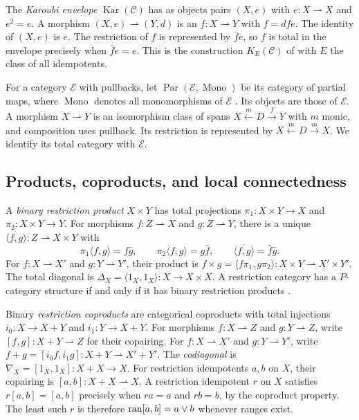 The \emph{Karoubi envelope} $\operatorname{Kar}(\mathcal C)$ has as objects
pairs $(X,e)$ with $e:X\rightharpoonup X$ and $e^2=e$. A morphism
$(X,e)\rightharpoonup(Y,d)$ is an $f:X\rightharpoonup Y$ with $f=dfe$. The identity of
$(X,e)$ is $e$. The restriction of $f$ is represented by $\bar f e$,
so $f$ is total in the envelope precisely when $\bar f e=e$.
This is the construction $K_E(\mathcal C)$ of
\cite[Section~2.3.3, Proposition~2.26]{CockettLack} with $E$ the class
of all idempotents.

For a category $\mathcal E$ with pullbacks, let
$\operatorname{Par}(\mathcal E,\operatorname{Mono})$ be its category
of partial maps, where $\operatorname{Mono}$ denotes all monomorphisms
of $\mathcal E$ \cite[Section~3]{CockettLack}.
Its objects are those of $\mathcal E$. A morphism
$X\rightharpoonup Y$ is an isomorphism class of spans
$X\xleftarrow{m}D\xrightarrow{f}Y$ with $m$ monic, and composition
uses pullback. Its restriction is represented by
$X\xleftarrow{m}D\xrightarrow{m}X$.
We identify its total category with $\mathcal E$.

\subsection{Products, coproducts, and local connectedness}

A \emph{binary restriction product} $X\times Y$ has total
projections $\pi_1:X\times Y\to X$ and $\pi_2:X\times Y\to Y$.
For morphisms $f:Z\rightharpoonup X$ and $g:Z\rightharpoonup Y$,
there is a unique $\langle f,g\rangle:Z\rightharpoonup X\times Y$
with
\[
 \pi_1\langle f,g\rangle=f\bar g,\qquad
 \pi_2\langle f,g\rangle=g\bar f,\qquad
 \overline{\langle f,g\rangle}=\bar f\bar g.
\]
For $f:X\rightharpoonup X'$ and $g:Y\rightharpoonup Y'$, their product is
$f\times g=\langle f\pi_1,g\pi_2\rangle:X\times Y\rightharpoonup X'\times Y'$.
The total diagonal is
$\Delta_X=\langle1_X,1_X\rangle:X\to X\times X$.
A restriction category has a $P$-category structure if and only if
it has binary restriction products
\cite[Proposition 4.5]{CockettLackIII}.

Binary \emph{restriction coproducts} are categorical coproducts with
total injections $i_0:X\to X+Y$ and $i_1:Y\to X+Y$.
For morphisms $f:X\rightharpoonup Z$ and $g:Y\rightharpoonup Z$,
write $[f,g]:X+Y\rightharpoonup Z$ for their copairing.
For $f:X\rightharpoonup X'$ and $g:Y\rightharpoonup Y'$, write
$f+g=[i_0 f,i_1 g]:X+Y\rightharpoonup X'+Y'$.
The \emph{codiagonal} is
$\nabla_X=[1_X,1_X]:X+X\to X$.
For restriction idempotents $a,b$ on $X$, their copairing is
$[a,b]:X+X\rightharpoonup X$. A restriction idempotent $r$ on $X$
satisfies $r[a,b]=[a,b]$ precisely when $ra=a$ and $rb=b$, by the
coproduct property. The least such $r$ is therefore
$\operatorname{ran}[a,b]=a\vee b$ whenever ranges exist.

